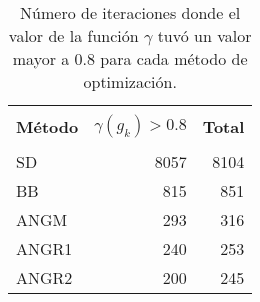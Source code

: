 \begin{table}[H]
    \centering
    \begin{tabular}{lrr}
        \hline                                               \\
        \textbf{Método} & $\gamma(g_k)>0.8$ & \textbf{Total} \\[0.25cm]  \hline
        \\
        SD              & 8057              & 8104           \\[0.25cm]
        BB              & 815               & 851            \\[0.25cm]
        ANGM            & 293               & 316            \\[0.25cm]
        ANGR1           & 240               & 253            \\[0.25cm]
        ANGR2           & 200               & 245            \\[0.25cm] \hline
    \end{tabular}
    \caption{Número de iteraciones donde el valor de la función $\gamma$ tuvó un valor mayor a 0.8 para cada método de optimización.}
    \label{table:gamma_function}
\end{table}